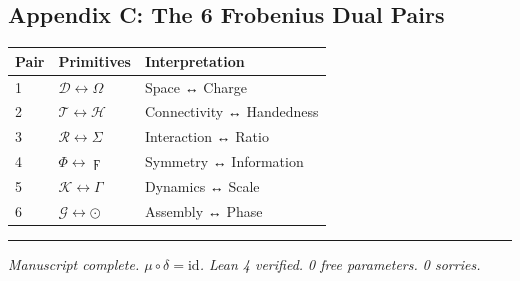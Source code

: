 \documentclass[12pt,a4paper]{article}
\begin{document}
\hypertarget{appendix-c-the-6-frobenius-dual-pairs}{%
\subsection{Appendix C: The 6 Frobenius Dual
Pairs}\label{appendix-c-the-6-frobenius-dual-pairs}}

\begin{longtable}[]{@{}lll@{}}
\toprule
Pair & Primitives & Interpretation\tabularnewline
\midrule
\endhead
1 & \(\mathcal{D} \leftrightarrow \Omega\) & Space ↔
Charge\tabularnewline
2 & \(\mathcal{T} \leftrightarrow \mathcal{H}\) & Connectivity ↔
Handedness\tabularnewline
3 & \(\mathcal{R} \leftrightarrow \Sigma\) & Interaction ↔
Ratio\tabularnewline
4 & \(\Phi \leftrightarrow \digamma\) & Symmetry ↔
Information\tabularnewline
5 & \(\mathcal{K} \leftrightarrow \Gamma\) & Dynamics ↔
Scale\tabularnewline
6 & \(\mathcal{G} \leftrightarrow \odot\) & Assembly ↔
Phase\tabularnewline
\bottomrule
\end{longtable}

\begin{center}\rule{0.5\linewidth}{0.5pt}\end{center}

\emph{Manuscript complete. \(\mu \circ \delta = \text{id}\). Lean 4
verified. 0 free parameters. 0 sorries.}
\end{document}
